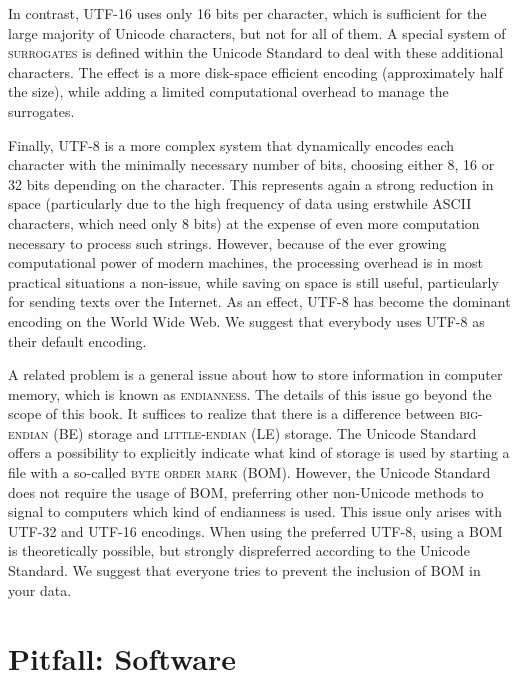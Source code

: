 In contrast, \textsc{UTF-16} uses only 16 bits per character, which is
sufficient for the large majority of Unicode characters, but not for all of
them. A special system of \textsc{surrogates} is defined within the Unicode Standard to
deal with these additional characters. The effect is a more disk-space efficient
encoding (approximately half the size), while adding a limited computational
overhead to manage the surrogates. 

Finally, \textsc{UTF-8} is a more complex system that dynamically encodes each
character with the minimally necessary number of bits, choosing either 8, 16 or
32 bits depending on the character. This represents again a strong reduction in
space (particularly due to the high frequency of data using erstwhile ASCII
characters, which need only 8 bits) at the expense of even more computation
necessary to process such strings. However, because of the ever growing
computational power of modern machines, the processing overhead is in most
practical situations a non-issue, while saving on space is still useful,
particularly for sending texts over the Internet. As an effect, UTF-8 has become
the dominant encoding on the World Wide Web. We suggest that everybody uses
UTF-8 as their default encoding.

A related problem is a general issue about how to store information in computer
memory, which is known as \textsc{endianness}. The details of this issue go
beyond the scope of this book. It suffices to realize that there is a
difference between \textsc{big-endian} (BE) storage and \textsc{little-endian}
(LE) storage. The Unicode Standard offers a possibility to explicitly indicate
what kind of storage is used by starting a file with a so-called \textsc{byte order
mark} (BOM). However, the Unicode Standard does not require the usage of BOM,
preferring other non-Unicode methods to signal to computers which kind of
endianness is used. This issue only arises with UTF-32 and UTF-16 encodings.
When using the preferred UTF-8, using a BOM is theoretically possible, but
strongly dispreferred according to the Unicode Standard. We suggest that
everyone tries to prevent the inclusion of BOM in your data.

\section{Pitfall: Software}
\label{software}



